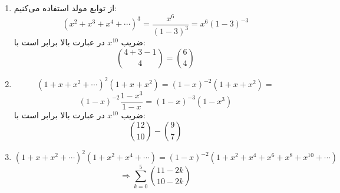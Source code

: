 \p
\begin{enumerate}
\item
از توابع مولد استفاده می‌کنیم:
$$(x^2 + x^3 + x^4 + \cdots)^3 = \frac{x^6}{(1-3)^3} = x^6(1-3)^{-3}$$
ضریب
$x^{10}$
در عبارت بالا برابر است با:
$$\binom{4+3-1}{4} = \binom{6}{4}$$
\item
$$(1 + x + x^2 + \cdots)^2(1 + x + x^2) = (1-x)^{-2}(1 + x + x^2) = $$
$$(1 - x)^{-2} \frac{1-x^3}{1-x} = (1-x)^{-3}(1-x^3)$$
ضریب
$x^{10}$
در عبارت بالا برابر است با:
$$\binom{12}{10} - \binom{9}{7}$$
\item
$$(1 + x + x^2 + \cdots)^2(1 + x^2 + x^4 + \cdots) = (1 - x)^{-2}(1 + x^2 + x^4 + x^6 + x^8 + x^{10} + \cdots)$$
$$\Rightarrow \sum_{k=0}^{5}\binom{11 - 2k}{10 - 2k}$$
\end{enumerate}
